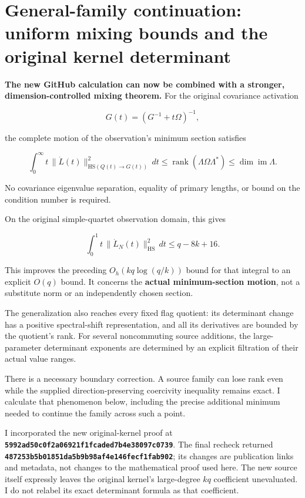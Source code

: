 \section{General-family continuation: uniform mixing bounds and the original kernel determinant}\label{general-family-continuation-uniform-mixing-bounds-and-the-original-kernel-determinant}

\textbf{The new GitHub calculation can now be combined with a stronger, dimension-controlled mixing theorem.} For the original covariance activation

\[
G(t)=(G^{-1}+t\Omega)^{-1},
\]

the complete motion of the observation's minimum section satisfies

\[
\boxed{
\int_0^\infty t\,\|\dot L(t)\|_{\mathrm{HS}(Q(t)\to G(t))}^{2}\,dt
\le \operatorname{rank}(\Lambda\Omega\Lambda^*)
\le \dim\operatorname{im}\Lambda.
}
\tag{1}
\]

No covariance eigenvalue separation, equality of primary lengths, or bound on the condition number is required.

On the original simple-quartet observation domain, this gives

\[
\boxed{
\int_0^1t\,\|\dot L_N(t)\|_{\mathrm{HS}}^2\,dt
\le q-8k+16.
}
\tag{2}
\]

This improves the preceding \(O_h(kq\log(q/k))\) bound for that integral to an explicit \(O(q)\) bound. It concerns the \textbf{actual minimum-section motion}, not a substitute norm or an independently chosen section.

The generalization also reaches every fixed flag quotient: its determinant change has a positive spectral-shift representation, and all its derivatives are bounded by the quotient's rank. For several noncommuting source additions, the large-parameter determinant exponents are determined by an explicit filtration of their actual value ranges.

There is a necessary boundary correction. A source family can lose rank even while the supplied direction-preserving coercivity inequality remains exact. I calculate that phenomenon below, including the precise additional minimum needed to continue the family across such a point.

I incorporated the new original-kernel proof at \textbf{\nolinkurl{5992ad50c0f2a06921f1fcaded7b4e38097c0739}}. The final recheck returned \textbf{\nolinkurl{487253b5b01851da5b9b98af4e146fecf1fab902}}; its changes are publication links and metadata, not changes to the mathematical proof used here. The new source itself expressly leaves the original kernel's large-degree \(kq\) coefficient unevaluated. I do not relabel its exact determinant formula as that coefficient.

